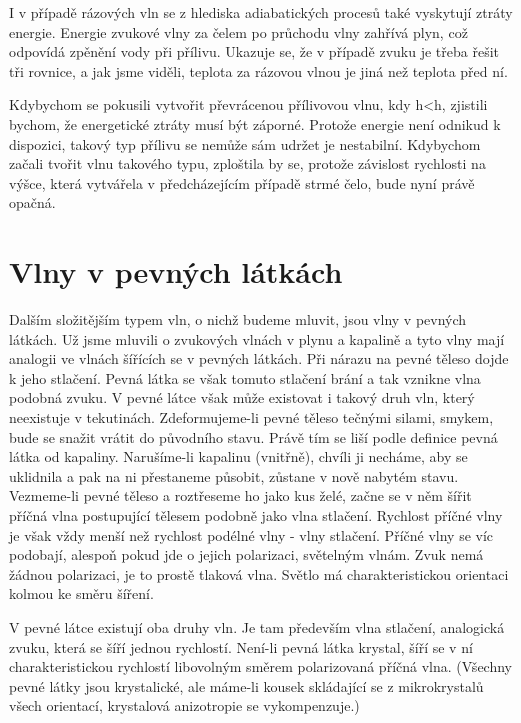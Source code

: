 {  
  I v případě rázových vln se z hlediska adiabatických procesů také vyskytují ztráty energie. 
  Energie zvukové vlny za čelem po průchodu vlny zahřívá plyn, což odpovídá zpěnění vody při 
  přílivu. Ukazuje se, že v případě zvuku je třeba řešit tři rovnice, a jak jsme viděli, teplota za 
  rázovou vlnou je jiná než teplota před ní.
  
  Kdybychom se pokusili vytvořit převrácenou přílivovou vlnu, kdy h<h, zjistili bychom, že 
  energetické ztráty musí být záporné. Protože energie není odnikud k dispozici, takový typ přílivu 
  se nemůže sám udržet je nestabilní. Kdybychom začali tvořit vlnu takového typu, zploštila by se, 
  protože závislost rychlosti na výšce, která vytvářela v předcházejícím případě strmé čelo, bude 
  nyní právě opačná.

\section{Vlny v pevných látkách}\label{fyz:IchapLIsecIII}
  Dalším složitějším typem vln, o nichž budeme mluvit, jsou vlny v pevných látkách. Už jsme mluvili 
  o zvukových vlnách v plynu a kapalině a tyto vlny mají analogii ve vlnách šířících se v pevných 
  látkách. Při nárazu na pevné těleso dojde k jeho stlačení. Pevná látka se však tomuto stlačení 
  brání a tak vznikne vlna podobná zvuku. V pevné látce však může existovat i takový druh vln, 
  který neexistuje v tekutinách. Zdeformujeme-li pevné těleso tečnými silami, smykem, bude se 
  snažit vrátit do původního stavu. Právě tím se liší podle definice pevná látka od kapaliny. 
  Narušíme-li kapalinu (vnitřně), chvíli ji necháme, aby se uklidnila a pak na ni přestaneme 
  působit, zůstane v nově nabytém stavu. Vezmeme-li pevné těleso a roztřeseme ho jako kus želé, 
  začne se v něm šířit příčná vlna postupující tělesem podobně jako vlna stlačení. Rychlost příčné 
  vlny je však vždy menší než rychlost podélné vlny - vlny stlačení. Příčné vlny se víc podobají, 
  alespoň pokud jde o jejich polarizaci, světelným vlnám. Zvuk nemá žádnou polarizaci, je to prostě 
  tlaková vlna. Světlo má charakteristickou orientaci kolmou ke směru šíření. 
  
  V pevné látce existují oba druhy vln. Je tam především vlna stlačení, analogická zvuku, která se 
  šíří jednou rychlostí. Není-li pevná látka krystal, šíří se v ní charakteristickou rychlostí 
  libovolným směrem polarizovaná příčná vlna. (Všechny pevné látky jsou krystalické, ale máme-li 
  kousek skládající se z mikrokrystalů všech orientací, krystalová anizotropie se vykompenzuje.) 
  
}
